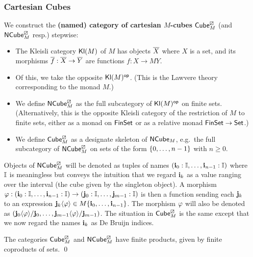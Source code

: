 \documentclass[a4paper]{memoir}
\begin{document}
\subsubsection{Cartesian Cubes}
\begin{definition}
	We construct the \textbf{(named) category of cartesian $M$-cubes} ${\mathsf{Cube}}^\boxslash_M$ (and ${\mathsf{NCube}}^\boxslash_M$ resp.) stepwise:
	\begin{itemize}
		\item The Kleisli category ${\mathsf{Kl}}(M)$ of $M$ has objects ${\overline{X}}$ where $X$ is a set, and its morphisms ${\overline{f}} : {\overline{X}} \to {\overline{Y}}$ are functions $f : X \to MY$.
		\item Of this, we take the opposite ${\mathsf{Kl}}(M)^{\mathsf{op}}$. (This is the Lawvere theory corresponding to the monad $M$.)
		\item We define ${\mathsf{NCube}}^\boxslash_M$ as the full subcategory of ${\mathsf{Kl}}(M)^{\mathsf{op}}$ on finite sets. (Alternatively, this is the opposite Kleisli category of the restriction of $M$ to finite sets, either as a monad on ${\mathsf{FinSet}}$ or as a relative monad ${\mathsf{FinSet}} \to {\mathsf{Set}}$.)
		\item We define ${\mathsf{Cube}}^\boxslash_M$ as a designate skeleton of ${\mathsf{NCube}}_M$, e.g.\ the full subcategory of ${\mathsf{NCube}}^\boxslash_M$ on sets of the form $\mathopen{}\left\{ 0, \ldots, n-1 \right\}\mathclose{}$ with $n \geq 0$.
	\end{itemize}
\end{definition}
Objects of ${\mathsf{NCube}}^\boxslash_M$ will be denoted as tuples of names $(\mathbf{i}_0 : {\mathbb I}, \ldots, \mathbf{i}_{n-1} : {\mathbb I})$ where ${\mathbb I}$ is meaningless but conveys the intuition that we regard $\mathbf{i}_k$ as a value ranging over the interval (the cube given by the singleton object).
A morphism $\varphi : (\mathbf{i}_0 : {\mathbb I}, \ldots, \mathbf{i}_{n-1} : {\mathbb I}) \to (\mathbf{j}_0 : {\mathbb I}, \ldots, \mathbf{j}_{m-1} : {\mathbb I})$ is then a function sending each $\mathbf{j}_k$ to an expression $\mathbf{j}_k \langle \varphi \rangle \in M\mathopen{}\left\{ \mathbf{i}_0, \ldots, \mathbf{i}_{n-1} \right\}\mathclose{}$.
The morphism $\varphi$ will also be denoted as $(\mathbf{j}_0 \langle \varphi \rangle / \mathbf{j}_0, \ldots, \mathbf{j}_{m-1} \langle \varphi \rangle / \mathbf{j}_{m-1})$.
The situation in ${\mathsf{Cube}}^\boxslash_M$ is the same except that we now regard the names $\mathbf{i}_k$ as De Bruijn indices.

\begin{corollary}
The categories ${\mathsf{Cube}}^\boxslash_M$ and ${\mathsf{NCube}}^\boxslash_M$ have finite products, given by finite coproducts of sets. \qed
\end{corollary}
\end{document}
